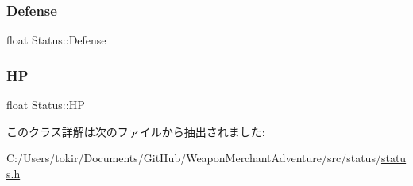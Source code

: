 \mbox{\label{class_status_aee944c63904ca1b6b3b04e24b2a9ac12}} 
\subsubsection{\texorpdfstring{Defense}{Defense}}
{\footnotesize\ttfamily float Status\+::\+Defense}

\mbox{\label{class_status_a0ec54fdb31c6c4b1a23b22742e6babb4}} 
\subsubsection{\texorpdfstring{HP}{HP}}
{\footnotesize\ttfamily float Status\+::\+HP}



このクラス詳解は次のファイルから抽出されました\+:\begin{DoxyCompactItemize}
\item 
C\+:/\+Users/tokir/\+Documents/\+Git\+Hub/\+Weapon\+Merchant\+Adventure/src/status/\mbox{\hyperlink{status_8h}{status.\+h}}\end{DoxyCompactItemize}
